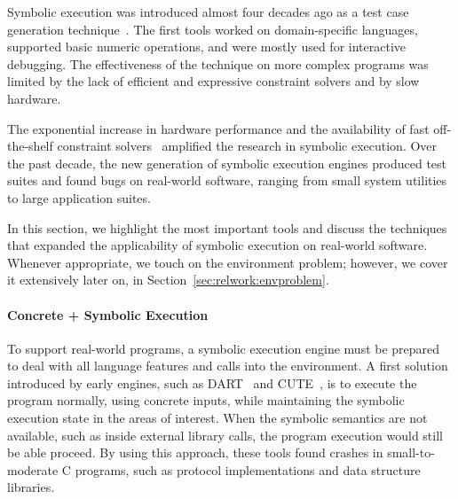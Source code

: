 
Symbolic execution was introduced almost four decades ago as a test case generation technique~\cite{king:symbolic:2, boyer:symbolic}.  The first tools worked on domain-specific languages, supported basic numeric operations, and were mostly used for interactive debugging.  The effectiveness of the technique on more complex programs was limited by the lack of efficient and expressive constraint solvers and by slow hardware.


The exponential increase in hardware performance and the availability of fast off-the-shelf constraint solvers~\cite{chaff,minisat,stp,Z3,cvc} amplified the research in symbolic execution.  Over the past decade, the new generation of symbolic execution engines produced test suites and found bugs on real-world software, ranging from small system utilities to large application suites.

In this section, we highlight the most important tools and discuss the techniques that expanded the applicability of symbolic execution on real-world software.  Whenever appropriate, we touch on the environment problem; however, we cover it extensively later on, in Section~\ref{sec:relwork:envproblem}.

\paragraph{Concrete + Symbolic Execution}

To support real-world programs, a symbolic execution engine must be prepared to deal with all language features and calls into the environment.
%
A first solution introduced by early engines, such as DART~\cite{dart} and CUTE~\cite{cute}, is to execute the program normally, using concrete inputs, while maintaining the symbolic execution state in the areas of interest.
%
When the symbolic semantics are not available, such as inside external library calls, the program execution would still be able proceed.
%
By using this approach, these tools found crashes in small-to-moderate C programs, such as protocol implementations and data structure libraries.

